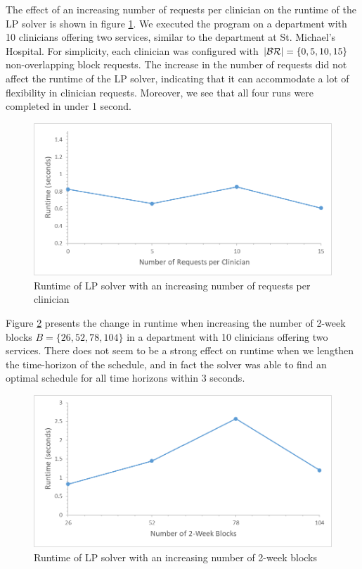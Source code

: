 The effect of an increasing number of requests per clinician on the runtime of the LP solver is shown in figure \ref{fig:runtime-requests}. We executed the program on a department with 10 clinicians offering two services, similar to the department at St. Michael's Hospital. For simplicity, each clinician was configured with $\abs{\mathcal{BR}} = \{0, 5, 10, 15\}$ non-overlapping block requests. The increase in the number of requests did not affect the runtime of the LP solver, indicating that it can accommodate a lot of flexibility in clinician requests. Moreover, we see that all four runs were completed in under 1 second. \\

\begin{figure}[h]
	\centering
	\includegraphics[scale=.5]{fig/runtime_requests}
	\caption{Runtime of LP solver with an increasing number of requests per clinician}
	\label{fig:runtime-requests}
\end{figure}

Figure \ref{fig:runtime-blocks} presents the change in runtime when increasing the number of 2-week blocks $B = \{26, 52, 78, 104\}$ in a department with 10 clinicians offering two services. There does not seem to be a strong effect on runtime when we lengthen the time-horizon of the schedule, and in fact the solver was able to find an optimal schedule for all time horizons within 3 seconds. \\ %

\begin{figure}[h]
	\centering
	\includegraphics[scale=.5]{fig/runtime_blocks}
	\caption{Runtime of LP solver with an increasing number of 2-week blocks}
	\label{fig:runtime-blocks}
\end{figure}

